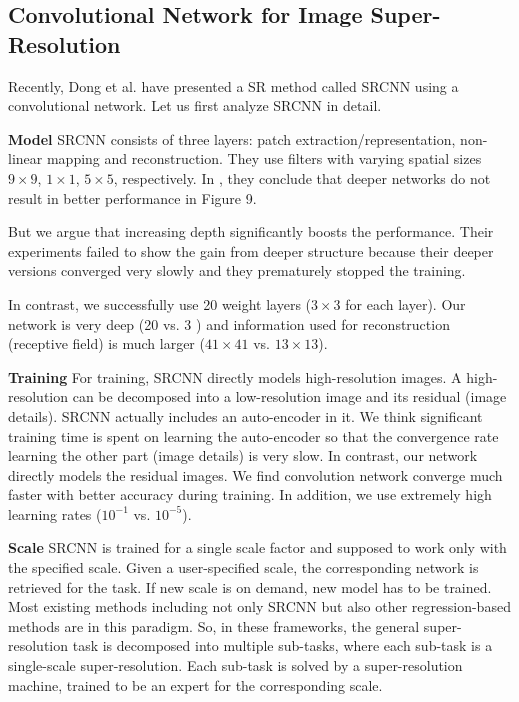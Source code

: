 \documentclass[10pt,twocolumn,letterpaper]{article}
\begin{document}
\subsection{Convolutional Network for Image Super-Resolution}
Recently, Dong et al. \cite{dong2015image} have presented a SR method called SRCNN using a convolutional network. Let us first analyze SRCNN in detail.

\textbf{Model}
SRCNN consists of three layers: patch extraction/representation, non-linear mapping and reconstruction. They use filters with varying spatial sizes $9\times9$, $1\times1$, $5\times5$, respectively. In \cite{dong2015image}, they conclude that deeper networks do not result in better performance in Figure 9.

But we argue that increasing depth significantly boosts the performance. Their experiments failed to show the gain from deeper structure because their deeper versions converged very slowly and they prematurely stopped the training.

In contrast, we successfully use 20 weight layers ($3\times3$ for each layer). Our network is very deep (20 vs. 3 \cite{dong2015image}) and information used for reconstruction (receptive field) is much larger ($41\times41$ vs. $13\times13$).

\textbf{Training}
For training, SRCNN directly models high-resolution images. A high-resolution can be decomposed into a low-resolution image and its residual (image details). SRCNN actually includes an auto-encoder in it. We think significant training time is spent on learning the auto-encoder so that the convergence rate learning the other part (image details) is very slow. In contrast, our network directly models the residual images. We find convolution network converge much faster with better accuracy during training. In addition, we use extremely high learning rates ($10^{-1}$ vs. $10^{-5}$).

\textbf{Scale} SRCNN is trained for a single scale factor and supposed to work only with the specified scale. Given a user-specified scale, the corresponding network is retrieved for the task. If new scale is on demand, new model has to be trained. Most existing methods including not only SRCNN but also other regression-based methods \cite{Timofte2013, Timofte, Yang2013} are in this paradigm. So, in these frameworks, the general super-resolution task is decomposed into multiple sub-tasks, where each sub-task is a single-scale super-resolution. Each sub-task is solved by a super-resolution machine, trained to be an expert for the corresponding scale. 
\end{document}
